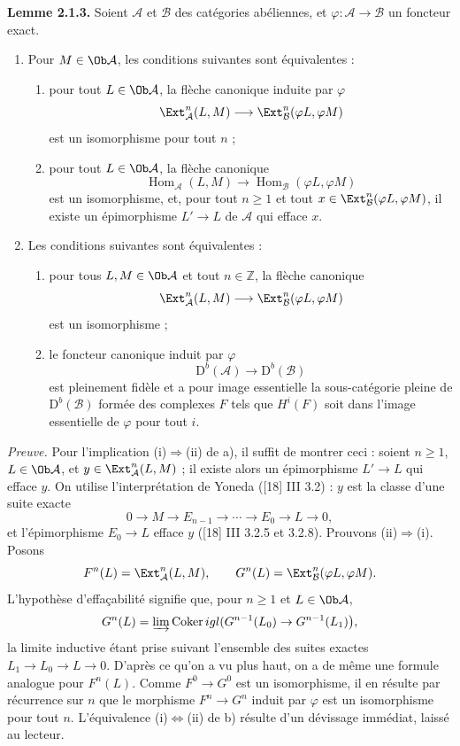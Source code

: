 \documentclass[11pt]{article}
\begin{document}
\textbf{Lemme 2.1.3.} Soient $\mathcal A$ et $\mathcal B$ des catégories abéliennes, et $\varphi:\mathcal A\to\mathcal B$ un foncteur exact.
\begin{enumerate}[label=\alph*)]
\item Pour $M\in\Ob\mathcal A$, les conditions suivantes sont équivalentes :
\begin{enumerate}[label=(\roman*)]
\item pour tout $L\in\Ob\mathcal A$, la flèche canonique induite par $\varphi$
\[
\Ext^n_{\mathcal A}(L,M)\longrightarrow\Ext^n_{\mathcal B}(\varphi L,\varphi M)
\]
est un isomorphisme pour tout $n$ ;
\item pour tout $L\in\Ob\mathcal A$, la flèche canonique
\[
\operatorname{Hom}_{\mathcal A}(L,M)\longrightarrow\operatorname{Hom}_{\mathcal B}(\varphi L,\varphi M)
\]
est un isomorphisme, et, pour tout $n\ge1$ et tout $x\in\Ext^n_{\mathcal B}(\varphi L,\varphi M)$, il existe un épimorphisme $L'\to L$ de $\mathcal A$ qui efface $x$.
\end{enumerate}
\item Les conditions suivantes sont équivalentes :
\begin{enumerate}[label=(\roman*)]
\item pour tous $L,M\in\Ob\mathcal A$ et tout $n\in\mathbb Z$, la flèche canonique
\[
\Ext^n_{\mathcal A}(L,M)\longrightarrow\Ext^n_{\mathcal B}(\varphi L,\varphi M)
\]
est un isomorphisme ;
\item le foncteur canonique induit par $\varphi$
\[
\mathrm D^b(\mathcal A)\longrightarrow\mathrm D^b(\mathcal B)
\]
est pleinement fidèle et a pour image essentielle la sous-catégorie pleine de $\mathrm D^b(\mathcal B)$ formée des complexes $F$ tels que $H^i(F)$ soit dans l'image essentielle de $\varphi$ pour tout $i$.
\end{enumerate}
\end{enumerate}

\emph{Preuve.} Pour l'implication (i)$\Rightarrow$(ii) de a), il suffit de montrer ceci : soient $n\ge1$, $L\in\Ob\mathcal A$, et $y\in\Ext^n_{\mathcal A}(L,M)$ ; il existe alors un épimorphisme $L'\to L$ qui efface $y$. On utilise l'interprétation de Yoneda ([18] III 3.2) : $y$ est la classe d'une suite exacte
\[
0\longrightarrow M\longrightarrow E_{n-1}\longrightarrow\cdots\longrightarrow E_0\longrightarrow L\longrightarrow0,
\]
et l'épimorphisme $E_0\to L$ efface $y$ ([18] III 3.2.5 et 3.2.8). Prouvons (ii)$\Rightarrow$(i). Posons
\[
F^n(L)=\Ext^n_{\mathcal A}(L,M),\qquad
G^n(L)=\Ext^n_{\mathcal B}(\varphi L,\varphi M).
\]
L'hypothèse d'effaçabilité signifie que, pour $n\ge1$ et $L\in\Ob\mathcal A$,
\[
G^n(L)=\varinjlim\operatorname{Coker}igl(G^{n-1}(L_0)\to G^{n-1}(L_1)\bigr),
\]
la limite inductive étant prise suivant l'ensemble des suites exactes $L_1\to L_0\to L\to0$. D'après ce qu'on a vu plus haut, on a de même une formule analogue pour $F^n(L)$. Comme $F^0\to G^0$ est un isomorphisme, il en résulte par récurrence sur $n$ que le morphisme $F^n\to G^n$ induit par $\varphi$ est un isomorphisme pour tout $n$. L'équivalence (i)$\Leftrightarrow$(ii) de b) résulte d'un dévissage immédiat, laissé au lecteur.
\end{document}

